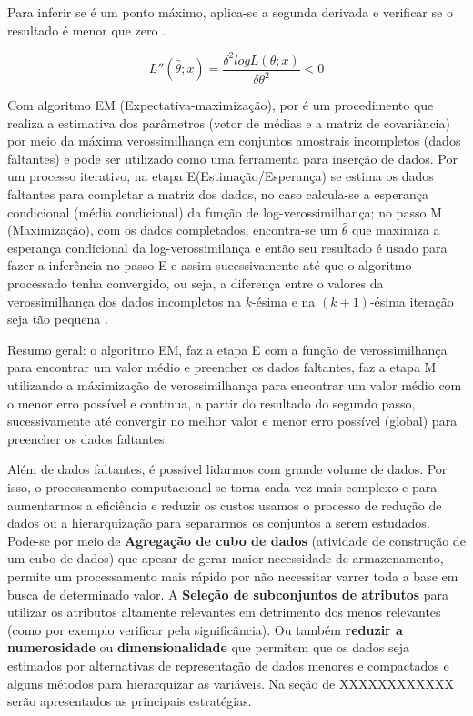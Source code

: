 \documentclass[
]{book}
\begin{document}
Para inferir se é um ponto máximo, aplica-se a segunda derivada e verificar se o resultado é menor que zero \citep{bolfarine2001introduccao}.

\begin{equation}
  L''(\hat{ \theta};x)=\frac{\delta^2 log L(\theta;x)}{\delta \theta^2}<0
\label{eq:derivadadoisverossimilhanca}
\end{equation}

Com algoritmo EM (Expectativa-maximização), por \citet{dempster1977maximum} é um procedimento que realiza a estimativa dos parâmetros (vetor de médias e a matriz de covariância) por meio da máxima verossimilhança em conjuntos amostrais incompletos (dados faltantes) e pode ser utilizado como uma ferramenta para inserção de dados. Por um processo iterativo, na etapa E(Estimação/Esperança) se estima os dados faltantes para completar a matriz dos dados, no caso calcula-se a esperança condicional (média condicional) da função de log-verossimilhança; no passo M (Maximização), com os dados completados, encontra-se um \(\hat{\theta}\) que maximiza a esperança condicional da log-verossimilança e então seu resultado é usado para fazer a inferência no passo E e assim sucessivamente até que o algoritmo processado tenha convergido, ou seja, a diferença entre o valores da verossimilhança dos dados incompletos na \(k\)-ésima e na \((k+1)\)-ésima iteração seja tão pequena \citetext{\citealp[ ]{enders2010applied}; \citealp{pereira2019inserccao}}.

Resumo geral: o algoritmo EM, faz a etapa E com a função de verossimilhança para encontrar um valor médio e preencher os dados faltantes, faz a etapa M utilizando a máximização de verossimilhança para encontrar um valor médio com o menor erro possível e continua, a partir do resultado do segundo passo, sucessivamente até convergir no melhor valor e menor erro possível (global) para preencher os dados faltantes.

Além de dados faltantes, é possível lidarmos com grande volume de dados. Por isso, o processamento computacional se torna cada vez mais complexo e para aumentarmos a eficiência e reduzir os custos usamos o processo de redução de dados ou a hierarquização para separarmos os conjuntos a serem estudados. Pode-se por meio de \textbf{Agregação de cubo de dados} (atividade de construção de um cubo de dados) que apesar de gerar maior necessidade de armazenamento, permite um processamento mais rápido por não necessitar varrer toda a base em busca de determinado valor. A \textbf{Seleção de subconjuntos de atributos} para utilizar os atributos altamente relevantes em detrimento dos menos relevantes (como por exemplo verificar pela significância). Ou também \textbf{reduzir a numerosidade } ou \textbf{dimensionalidade} que permitem que os dados seja estimados por alternativas de representação de dados menores e compactados e alguns métodos para hierarquizar as variáveis. Na seção de XXXXXXXXXXXX serão apresentados as principais estratégias.
\end{document}
